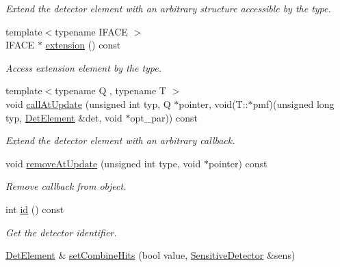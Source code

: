 \begin{DoxyCompactItemize}
\begin{DoxyCompactList}\small\item\em Extend the detector element with an arbitrary structure accessible by the type. \item\end{DoxyCompactList}\item 
{\footnotesize template$<$typename IFACE $>$ }\\IFACE $\ast$ \hyperlink{class_d_d4hep_1_1_geometry_1_1_det_element_a5d801350ab0e5f8918785f3a95e0fb30}{extension} () const 
\begin{DoxyCompactList}\small\item\em Access extension element by the type. \item\end{DoxyCompactList}\item 
{\footnotesize template$<$typename Q , typename T $>$ }\\void \hyperlink{class_d_d4hep_1_1_geometry_1_1_det_element_a0b5ccd59de30369496419134f803855c}{callAtUpdate} (unsigned int typ, Q $\ast$pointer, void(T::$\ast$pmf)(unsigned long typ, \hyperlink{class_d_d4hep_1_1_geometry_1_1_det_element}{DetElement} \&det, void $\ast$opt\_\-par)) const 
\begin{DoxyCompactList}\small\item\em Extend the detector element with an arbitrary callback. \item\end{DoxyCompactList}\item 
void \hyperlink{class_d_d4hep_1_1_geometry_1_1_det_element_acb4a6a5c092ea6e4c4d9bfa781a7eea8}{removeAtUpdate} (unsigned int type, void $\ast$pointer) const 
\begin{DoxyCompactList}\small\item\em Remove callback from object. \item\end{DoxyCompactList}\item 
int \hyperlink{class_d_d4hep_1_1_geometry_1_1_det_element_ab792b1e02d95042fd94897283df9f8fa}{id} () const 
\begin{DoxyCompactList}\small\item\em Get the detector identifier. \item\end{DoxyCompactList}\item 
\hyperlink{class_d_d4hep_1_1_geometry_1_1_det_element}{DetElement} \& \hyperlink{class_d_d4hep_1_1_geometry_1_1_det_element_a3b5dbbb87e8e1ddb64fc94e98cd5a70b}{setCombineHits} (bool value, \hyperlink{class_d_d4hep_1_1_geometry_1_1_sensitive_detector}{SensitiveDetector} \&sens)

\end{DoxyCompactItemize}
